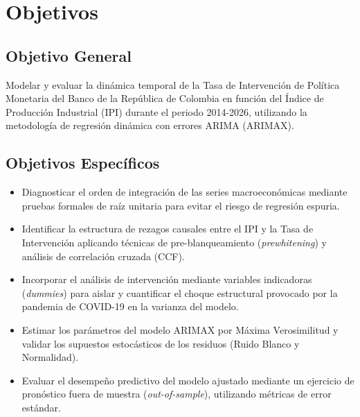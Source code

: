 \documentclass[11pt,letterpaper]{article}
\begin{document}

\section{Objetivos}

\subsection{Objetivo General}
Modelar y evaluar la dinámica temporal de la Tasa de Intervención de Política Monetaria del Banco de la República de Colombia en función del Índice de Producción Industrial (IPI) durante el periodo 2014-2026, utilizando la metodología de regresión dinámica con errores ARIMA (ARIMAX).

\subsection{Objetivos Específicos}
\begin{itemize}
    \item Diagnosticar el orden de integración de las series macroeconómicas mediante pruebas formales de raíz unitaria para evitar el riesgo de regresión espuria.
    \item Identificar la estructura de rezagos causales entre el IPI y la Tasa de Intervención aplicando técnicas de pre-blanqueamiento (\textit{prewhitening}) y análisis de correlación cruzada (CCF).
    \item Incorporar el análisis de intervención mediante variables indicadoras (\textit{dummies}) para aislar y cuantificar el choque estructural provocado por la pandemia de COVID-19 en la varianza del modelo.
    \item Estimar los parámetros del modelo ARIMAX por Máxima Verosimilitud y validar los supuestos estocásticos de los residuos (Ruido Blanco y Normalidad).
    \item Evaluar el desempeño predictivo del modelo ajustado mediante un ejercicio de pronóstico fuera de muestra (\textit{out-of-sample}), utilizando métricas de error estándar.
\end{itemize}
\end{document}
